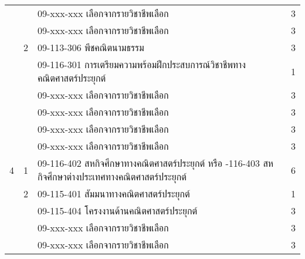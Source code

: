 \begin{longtable}{|c|c|>{\raggedright}p{}|c|}
	&&09-xxx-xxx	เลือกจากรายวิชาชีพเลือก&3\\
	&&09-xxx-xxx	เลือกจากรายวิชาชีพเลือก&3\\
	\cline{2-4}
	&2&09-113-306	พีชคณิตนามธรรม&3\\
	&&09-116-301	การเตรียมความพร้อมฝึกประสบการณ์วิชาชีพทางคณิตศาสตร์ประยุกต์&1\\
	&&09-xxx-xxx	เลือกจากรายวิชาชีพเลือก&3\\
	&&09-xxx-xxx	เลือกจากรายวิชาชีพเลือก&3\\
	&&09-xxx-xxx	เลือกจากรายวิชาชีพเลือก&3\\
	&&09-xxx-xxx	เลือกจากรายวิชาชีพเลือก&3\\
	\hline
	4&1&09-116-402	สหกิจศึกษาทางคณิตศาสตร์ประยุกต์\newline
	หรือ
	\newline
	09-116-403	สหกิจศึกษาต่างประเทศทางคณิตศาสตร์ประยุกต์&6\\
	\cline{2-4}
	&2&09-115-401	สัมมนาทางคณิตศาสตร์ประยุกต์&1\\
	&&09-115-404	โครงงานด้านคณิตศาสตร์ประยุกต์&3\\
	&&09-xxx-xxx	เลือกจากรายวิชาชีพเลือก&3\\
	&&09-xxx-xxx	เลือกจากรายวิชาชีพเลือก&3\\

\end{longtable}

\newpage

